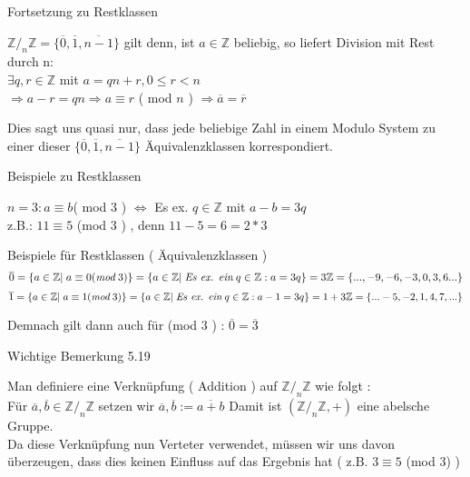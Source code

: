 \documentclass[headsepline,12pt,a4paper]{scrartcl}
\begin{document}
\begin{center}
\item[Fortsetzung zu Restklassen]
\end{center}
\item $ \mathbb{Z} /_n \mathbb{Z} = \{\overline{0},\overline{1},\overline{n-1}\} $ gilt denn, ist $ a \in \mathbb{Z} $ beliebig, so liefert Division mit Rest durch n: \\
$ \exists q,r \in \mathbb{Z} $ mit $ a = qn+r , 0 \leq r < n $ \\
$ \Rightarrow a-r = qn \Rightarrow a \equiv r $ ( mod $n$ ) $ \Rightarrow \overline{a} = \overline{r} $ \\
\item Dies sagt uns quasi nur, dass jede beliebige Zahl in einem Modulo System zu einer dieser $\{\overline{0},\overline{1},\overline{n-1}\} $ Äquivalenzklassen korrespondiert. 
\begin{center}
\item[Beispiele zu Restklassen]
\end{center}
\item $ n=3 : a \equiv b $( mod $3$ ) $\Leftrightarrow $ Es ex. $ q \in \mathbb{Z} $ mit $a-b = 3q $ \\
z.B.: $ 11 \equiv 5 $ (mod 3 ) , denn $11-5 = 6 = 2*3$ 
\item Beispiele für Restklassen ( Äquivalenzklassen ) \\
$$ \overline{0} = \{a \in \mathbb{Z}| \; a \equiv 0 (\textit{mod} \; 3 ) \} = \\
 \{a \in \mathbb{Z}| \; \textit{Es ex. ein} \; q \in \mathbb{Z} : a = 3q \} = 3 \mathbb{Z} = \{...,-9,-6,-3,0,3,6...\} $$
 $$ \overline{1} = \{a \in \mathbb{Z}| \; a \equiv 1 (\textit{mod} \; 3 ) \} = \\
 \{a \in \mathbb{Z}| \; \textit{Es ex. ein} \; q \in \mathbb{Z} : a-1 = 3q \} = 1+ 3 \mathbb{Z} = \{...-5,-2,1,4,7,...\} $$
 
Demnach gilt dann auch für (mod $3$ ) : $ \overline{0} = \overline{3} $

\begin{center}
\item[Wichtige Bemerkung 5.19]
\end{center}
\item Man definiere eine Verknüpfung ( Addition ) auf $ \mathbb{Z} /_n \mathbb{Z}$ wie folgt : \\
Für $ \overline{a}, \overline{b} \in  \mathbb{Z} /_n \mathbb{Z} $ setzen wir $ \overline{a}, \overline{b} := \overline{a+b}$
Damit ist $(\mathbb{Z} /_n \mathbb{Z} , + )$ eine abelsche Gruppe. \\
Da diese Verknüpfung nun Verteter verwendet, müssen wir uns davon überzeugen, dass dies keinen Einfluss auf das Ergebnis hat ( z.B. $ 3 \equiv 5 $ (mod $3$) )
\end{document}
